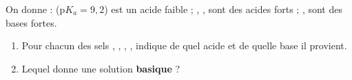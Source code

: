 \documentclass[11pt,a4paper]{article}
\begin{document}
\begin{exo}
On donne :  ($\mathrm{p}K_a = 9{,}2$) est un acide faible ; , ,  sont des
acides forts ; ,  sont des bases fortes.
\begin{enumerate}[label=\alph*)]
  \item Pour chacun des sels , , , , indique de quel acide et de quelle
        base il provient.
  \item Lequel donne une solution \textbf{basique} ?
\end{enumerate}
\end{exo}
\end{document}
